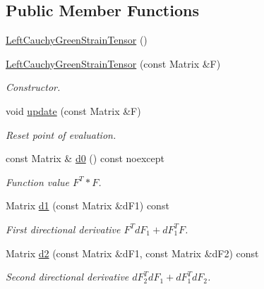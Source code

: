 \subsection*{\-Public \-Member \-Functions}
\begin{DoxyCompactItemize}
\item 
\hyperlink{classFunG_1_1LinearAlgebra_1_1LeftCauchyGreenStrainTensor_af71c16a98707cf3cc1756d319cddbeed}{\-Left\-Cauchy\-Green\-Strain\-Tensor} ()
\item 
\hyperlink{classFunG_1_1LinearAlgebra_1_1LeftCauchyGreenStrainTensor_aa93f7d040aa56744bd542ccb56bafa5c}{\-Left\-Cauchy\-Green\-Strain\-Tensor} (const \-Matrix \&\-F)
\begin{DoxyCompactList}\small\item\em \-Constructor. \end{DoxyCompactList}\item 
void \hyperlink{classFunG_1_1LinearAlgebra_1_1LeftCauchyGreenStrainTensor_a3db2fef2c9455dfe7f3bad1036b0d18a}{update} (const \-Matrix \&\-F)
\begin{DoxyCompactList}\small\item\em \-Reset point of evaluation. \end{DoxyCompactList}\item 
const \-Matrix \& \hyperlink{classFunG_1_1LinearAlgebra_1_1LeftCauchyGreenStrainTensor_a61ede5d83a98cf94898aedc503849a60}{d0} () const noexcept
\begin{DoxyCompactList}\small\item\em \-Function value $ F^T * F $. \end{DoxyCompactList}\item 
\-Matrix \hyperlink{classFunG_1_1LinearAlgebra_1_1LeftCauchyGreenStrainTensor_a4aea22c48162713fa53fdf62bd334356}{d1} (const \-Matrix \&d\-F1) const 
\begin{DoxyCompactList}\small\item\em \-First directional derivative $ F^T dF_1 + dF_1^T F $. \end{DoxyCompactList}\item 
\-Matrix \hyperlink{classFunG_1_1LinearAlgebra_1_1LeftCauchyGreenStrainTensor_a77922731eee119129696eda862cc88e0}{d2} (const \-Matrix \&d\-F1, const \-Matrix \&d\-F2) const 
\begin{DoxyCompactList}\small\item\em \-Second directional derivative $ dF_2^T dF_1 + dF_1^T dF_2 $. \end{DoxyCompactList}\end{DoxyCompactItemize}


